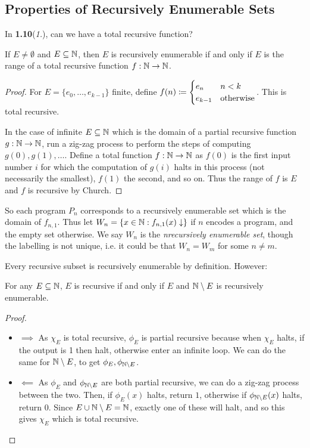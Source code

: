 \documentclass[10pt,a4paper]{article}
\begin{document}
\subsection*{Properties of Recursively Enumerable Sets}
In \textbf{1.10}(\textit{1.}), can we have a total recursive function?
\begin{theorem}
If $E \neq \emptyset$ and $E\subseteq \mathbb{N}$, then $E$ is recursively enumerable if and only if $E$ is the range of a total recursive function $f:\mathbb{N} \to \mathbb{N}$.
\end{theorem}
\begin{proof}
For $E = \{e_0, \ldots, e_{k-1}\}$ finite, define $f(n)\coloneqq \begin{cases} e_n & n <k \\ e_{k-1} & \text{otherwise}\end{cases}$. This is total recursive.

In the case of infinite $E \subseteq \mathbb{N}$ which is the domain of a partial recursive function $g:\mathbb{N} \to \mathbb{N}$, run a zig-zag process to perform the steps of computing $g(0), g(1), \ldots$. Define a total function $f:\mathbb{N}\to\mathbb{N}$ as $f(0)$ is the first input number $i$ for which the computation of $g(i)$ halts in this process (not necessarily the smallest), $f(1)$ the second, and so on. Thus the range of $f$ is $E$ and $f$ is recursive by Church.
\end{proof}

So each program $P_n$ corresponds to a recursively enumerable set which is the domain of $f_{n,1}$. Thus let $W_n = \{x\in\mathbb{N} : f_{n,1}(x) \downarrow \}$ if $n$ encodes a program, and the empty set otherwise. We say $W_n$ is the \emph{n\th recursively enumerable set}, though the labelling is not unique, i.e. it could be that $W_n = W_m$ for some $n\neq m$.

Every recursive subset is recursively enumerable by definition. However:
\begin{theorem}
For any $E\subseteq \mathbb{N}$, $E$ is recursive if and only if $E$ and $\mathbb{N}\setminus E$ is recursively enumerable.
\end{theorem}
\begin{proof}\item
\begin{itemize}
\item{\underline{$\implies$}} As $\chi_E$ is total recursive, $\phi_E$ is partial recursive because when $\chi_E$ halts, if the output is 1 then halt, otherwise enter an infinite loop. We can do the same for $\mathbb{N}\setminus E$, to get $\phi_E, \phi_{\mathbb{N}\setminus E}$.
\item{\underline{$\impliedby$}} As $\phi_E$ and $\phi_{\mathbb{N}\setminus E}$ are both partial recursive, we can do a zig-zag process between the two. Then, if $\phi_E(x)$ halts, return $1$, otherwise if $\phi_{\mathbb{N}\setminus E}(x)$ halts, return $0$. Since $E \cup \mathbb{N}\setminus E = \mathbb{N}$, exactly one of these will halt, and so this gives $\chi_E$ which is total recursive.
\end{itemize}
\end{proof}
\end{document}
